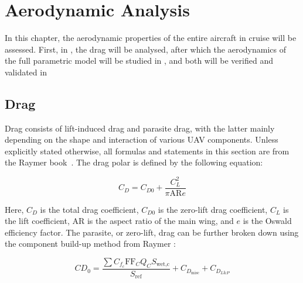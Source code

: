 \chapter{Aerodynamic Analysis}
\label{ch:Aerodynamic_Analysis}
In this chapter, the aerodynamic properties of the entire aircraft in cruise will be assessed.
First, in , the drag will be analysed, after which the aerodynamics of the full parametric model will be studied in , and both will be verified and validated in 

\section{Drag}
\label{sec:DRAG}

Drag consists of lift-induced drag and parasite drag, with the latter mainly depending on the shape and interaction of various UAV components.
Unless explicitly stated otherwise, all formulas and statements in this section are from the Raymer book~\cite{raymer1992aircraft}.
The drag polar is defined by the following equation:

\begin{equation}
    C_D = C_{D0} + \frac{C_L^2}{\pi \mathrm{AR} e}
\end{equation}
 

Here, $C_D$ is the total drag coefficient, 
$C_{D0}$ is the zero-lift drag coefficient, $C_L$ is the lift coefficient, $\mathrm{AR}$ is the aspect ratio of the main wing, and $e$ is the Oswald efficiency factor.
The parasite, or zero-lift, drag can be further broken down using the component build-up method from Raymer \cite{raymer1992aircraft}:

\begin{equation}
    C{D_0} = \frac{\sum C_{f_{c}} \mathrm{FF}_C Q_C S_\text{wet,c}}{S_\text{ref}} + C_{D_\text{misc}} + C_{D_{L\&P}}
\end{equation}

